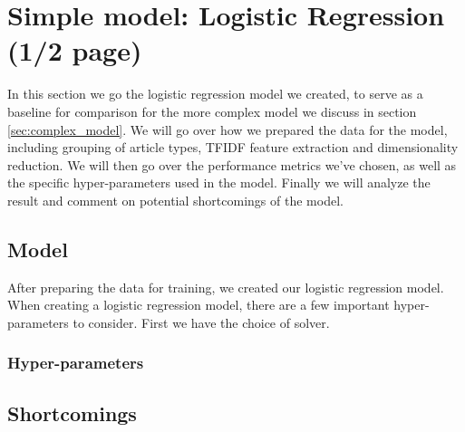 \section{Simple model: Logistic Regression (1/2 page)} 
In this section we go the logistic regression model we created, to serve as a baseline for comparison for the more
complex model we discuss in section \ref{sec:complex_model}. We will go over how we prepared the data for the model,
including grouping of article types, TFIDF feature extraction and dimensionality reduction. We will then go over the
performance metrics we've chosen, as well as the specific hyper-parameters used in the model. Finally we will analyze
the result and comment on potential shortcomings of the model. 

\subsection{Model}
After preparing the data for training, we created our logistic regression model. When creating a logistic regression
model, there are a few important hyper-parameters to consider. First we have the choice of solver. 
\subsubsection{Hyper-parameters}


\subsection{Shortcomings}



